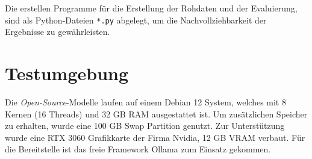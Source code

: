 Die erstellen Programme für die Erstellung der Rohdaten und der Evaluierung, sind als Python-Dateien \texttt{*.py} abgelegt, um die Nachvollziehbarkeit der Ergebnisse zu gewährleisten.








\section{Testumgebung}
Die \textit{Open-Source}-Modelle laufen auf einem Debian 12 System, welches mit 8 Kernen (16 Threads) und 32 GB RAM ausgestattet ist. Um zusätzlichen Speicher zu erhalten, wurde eine 100 GB Swap Partition genutzt. Zur Unterstützung wurde eine RTX 3060 Grafikkarte der Firma Nvidia, 12 GB VRAM verbaut. Für die Bereitstelle ist das freie Framework Ollama zum Einsatz gekommen.\vspace{0.2cm}

